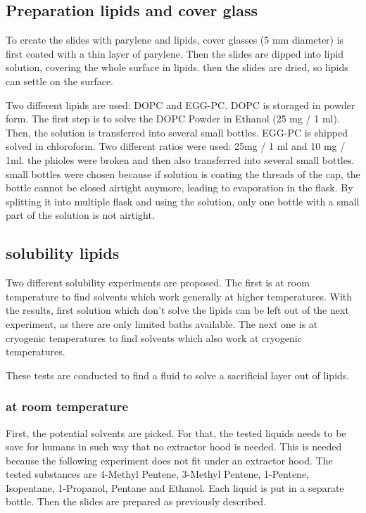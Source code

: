 \subsection{Preparation lipids and cover glass}

To create the slides with parylene and lipids, cover glasses (5 mm diameter) is first coated with a thin layer of parylene. Then the slides are dipped into lipid solution, covering the whole surface in lipids. then the slides are dried, so lipids can settle on the surface. 

Two different lipids are used: DOPC and EGG-PC. DOPC is storaged in powder form. The first step is to solve the DOPC Powder in Ethanol (25 mg / 1 ml). Then, the solution is transferred into several small bottles. EGG-PC is shipped solved in chloroform. Two different ratios were used: 25mg / 1 ml and 10 mg / 1ml. the phioles were broken and then also transferred into several small bottles. small bottles were chosen because if solution is coating the threads of the cap, the bottle cannot be closed airtight anymore, leading to evaporation in the flask. By splitting it into multiple flask and using the solution, only one bottle with a small part of the solution is not airtight.

\subsection{solubility lipids}

Two different solubility experiments are proposed. The first is at room temperature to find solvents which work generally at higher temperatures. With the results, first solution which don't solve the lipids can be left out of the next experiment, as there are only limited baths available. The next one is at cryogenic temperatures to find solvents which also work at cryogenic temperatures.

These tests are conducted to find a fluid to solve a sacrificial layer out of lipids.

\subsubsection{at room temperature}

First, the potential solvents are picked. For that, the tested liquids needs to be save for humans in such way that no extractor hood is needed. This is needed because the following experiment does not fit under an extractor hood. The tested substances are 4-Methyl Pentene, 3-Methyl Pentene, 1-Pentene, Isopentane, 1-Propanol, Pentane and Ethanol. Each liquid is put in a separate bottle. Then the slides are prepared  as previously described.

